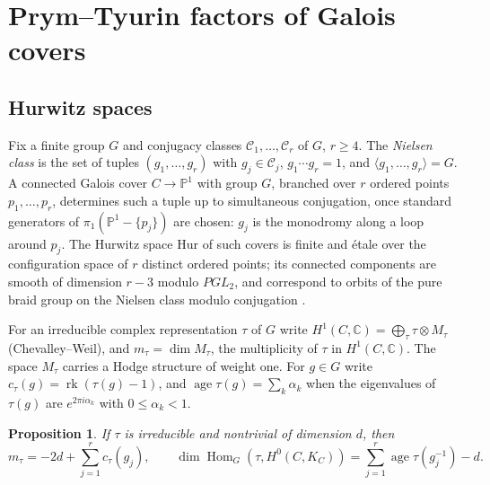 \documentclass[11pt]{amsart}
\newtheorem{proposition}[theorem]{Proposition}
\theoremstyle{definition}
\theoremstyle{remark}
\newcommand{\C}{\mathbb C}
\newcommand{\PP}{\mathbb P}
\newcommand{\Hom}{\operatorname{Hom}}
\newcommand{\rk}{\operatorname{rk}}
\newcommand{\age}{\operatorname{age}}
\newcommand{\cH}{\mathrm{Hur}}
\begin{document}
\section{Prym--Tyurin factors of Galois covers}\label{sec:covers}

\subsection{Hurwitz spaces}
Fix a finite group $G$ and conjugacy classes $\mathcal C_1,\dots,\mathcal C_r$ of $G$, $r\ge4$. The \emph{Nielsen class} is the set of tuples $(g_1,\dots,g_r)$ with $g_j\in\mathcal C_j$, $g_1\cdots g_r=1$, and $\langle g_1,\dots,g_r\rangle=G$. A connected Galois cover $C\to\PP^1$ with group $G$, branched over $r$ ordered points $p_1,\dots,p_r$, determines such a tuple up to simultaneous conjugation, once standard generators of $\pi_1(\PP^1-\{p_j\})$ are chosen: $g_j$ is the monodromy along a loop around $p_j$. The Hurwitz space $\cH$ of such covers is finite and \'etale over the configuration space of $r$ distinct ordered points; its connected components are smooth of dimension $r-3$ modulo $PGL_2$, and correspond to orbits of the pure braid group on the Nielsen class modulo conjugation \cite{FriedVolklein}.

For an irreducible complex representation $\tau$ of $G$ write $H^1(C,\C)=\bigoplus_\tau\tau\otimes M_\tau$ (Chevalley--Weil), and $m_\tau=\dim M_\tau$, the multiplicity of $\tau$ in $H^1(C,\C)$. The space $M_\tau$ carries a Hodge structure of weight one. For $g\in G$ write $c_\tau(g)=\rk(\tau(g)-1)$, and $\age\tau(g)=\sum_k\alpha_k$ when the eigenvalues of $\tau(g)$ are $e^{2\pi i\alpha_k}$ with $0\le\alpha_k<1$.

\begin{proposition}\label{prop:mult}
If $\tau$ is irreducible and nontrivial of dimension $d$, then
\[
m_\tau=-2d+\sum_{j=1}^rc_\tau(g_j),\qquad \dim\Hom_G(\tau,H^0(C,K_C))=\sum_{j=1}^r\age\tau(g_j^{-1})-d.
\]
\end{proposition}
\end{document}
